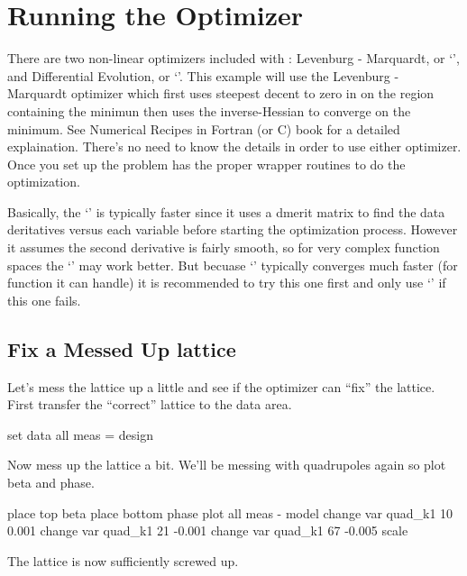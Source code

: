 \section{Running the Optimizer}
\label{s:optimizer}

There are two non-linear optimizers included with \tao: Levenburg - Marquardt,
or `', and
Differential Evolution, or `'. This example will use the 
Levenburg - Marquardt optimizer which first uses steepest decent to zero in on
the region containing the minimun then uses the inverse-Hessian to converge on
the minimum. See Numerical Recipes in Fortran (or C) book for a detailed
explaination. There's no need to know the details in order to use either
optimizer. Once you set up the problem \tao has the proper wrapper routines to
do the optimization.

Basically, the `' is typically faster since it uses a dmerit matrix to find
the data deritatives versus each variable before starting the optimization process.
However it assumes the second derivative is fairly smooth, so for very complex function 
spaces the `' may work better. But becuase `' typically converges much faster
(for function it can handle) it is recommended to try this one first and only use `'
if this one fails. 

\subsection{Fix a Messed Up lattice}
\label{ss:fix_it}

Let's mess the lattice up a little and see if the optimizer can ``fix'' the
lattice. First transfer the ``correct'' lattice to the  data area.
\begin{example}
  set data all meas = design
\end{example}
Now mess up the lattice a bit. We'll be messing with quadrupoles again so plot
beta and phase.
\begin{example}
  place top beta
  place bottom phase
  plot all meas - model
  change var quad\_k1 10 0.001
  change var quad\_k1 21 -0.001
  change var quad\_k1 67 -0.005
  scale
\end{example}
The lattice is now sufficiently screwed up.

